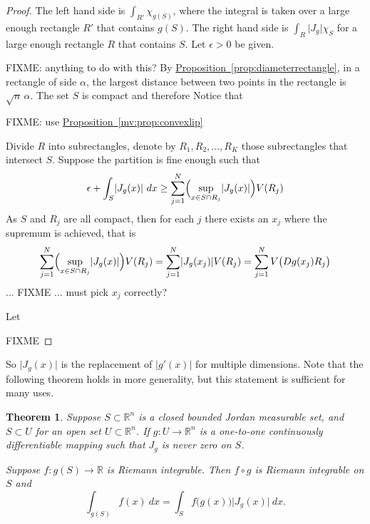 \documentclass[12pt]{book}
\newcommand{\sabs}[1]{\lvert {#1} \rvert}
\newcommand{\R}{{\mathbb{R}}}
\theoremstyle{plain}
\newtheorem{thm}{Theorem}[section]
\theoremstyle{remark}
\theoremstyle{definition}
\theoremstyle{exercise}
\theoremstyle{example}
\newcommand{\propref}[1]{\hyperref[#1]{Proposition~\ref*{#1}}}
\begin{document}
\begin{proof}
The left hand side is $\int_{R'} \chi_{g(S)}$, where the integral is taken over a
large enough rectangle $R'$ that contains $g(S)$.
The right hand side is $\int_{R} \sabs{J_g} \chi_S$ for
a large enough rectangle $R$ that contains $S$.  Let $\epsilon > 0$ be
given.

FIXME: anything to do with this?
By \propref{prop:diameterrectangle},
in a rectangle of side $\alpha$, the largest distance 
between two points in the rectangle is $\sqrt{n} \, \alpha$.
The set $S$ is compact and therefore 
Notice that 

FIXME: use
\propref{mv:prop:convexlip}





Divide $R$ into
subrectangles, denote
by $R_1,R_2,\ldots,R_K$ those subrectangles that intersect $S$.
Suppose the partition is fine enough such that
\begin{equation*}
\epsilon + \int_S \sabs{J_g(x)} ~ dx \geq
\sum_{j=1}^N \Bigl(\sup_{x \in S \cap R_j} \sabs{J_g(x)} \Bigr) V(R_j)
\end{equation*}
As $S$ and $R_j$ are all compact, then for each $j$ there exists an $x_j$
where the supremum is achieved, that is
\begin{equation*}
\sum_{j=1}^N \Bigl(\sup_{x \in S \cap R_j} \sabs{J_g(x)} \Bigr) V(R_j)
=
\sum_{j=1}^N \sabs{J_g(x_j)}  V(R_j)
=
\sum_{j=1}^N V\bigl(Dg(x_j) R_j\bigr)
\end{equation*}
... FIXME ... must pick $x_j$ correctly?




Let 






FIXME
\end{proof}

So $\sabs{J_g(x)}$ is the replacement of $\sabs{g'(x)}$ for multiple
dimensions.  Note that the following theorem holds in more generality,
but this statement is sufficient for many uses.

\begin{thm}
Suppose $S \subset \R^n$ is a closed bounded Jordan measurable set,
and $S \subset U$ for an open set $U \subset \R^n$.  If
$g \colon U \to \R^n$ is a one-to-one
continuously differentiable mapping such that
$J_g$ is never zero on $S$.

Suppose $f \colon g(S) \to \R$ is Riemann
integrable.  Then $f \circ g$ is Riemann integrable on $S$ and
\begin{equation*}
\int_{g(S)} f(x) ~ dx = 
\int_S f\bigl(g(x)\bigr) \sabs{J_g(x)} ~ dx .
\end{equation*}
\end{thm}
\end{document}
